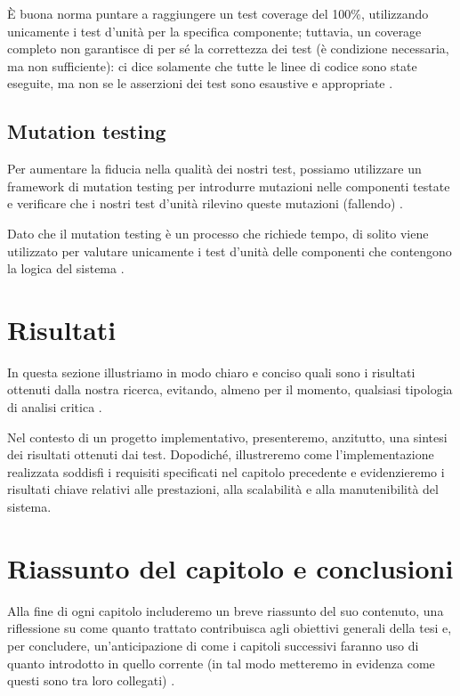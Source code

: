 \medskip

È buona norma puntare a raggiungere un test coverage del 100\%, utilizzando unicamente i test d'unità per la specifica componente; tuttavia, un coverage completo non garantisce di per sé la correttezza dei test (è condizione necessaria, ma non sufficiente): ci dice solamente che tutte le linee di codice sono state eseguite, ma non se le asserzioni dei test sono esaustive e appropriate \cite{bettini2021tdd}.

\subsection{Mutation testing}

Per aumentare la fiducia nella qualità dei nostri test, possiamo utilizzare un framework di mutation testing per introdurre mutazioni nelle componenti testate e verificare che i nostri test d'unità rilevino queste mutazioni (fallendo) \cite{bettini2021tdd}.

\medskip

Dato che il mutation testing è un processo che richiede tempo, di solito viene utilizzato per valutare unicamente i test d'unità delle componenti che contengono la logica del sistema \cite{bettini2021tdd}.

\section{Risultati}

In questa sezione illustriamo in modo chiaro e conciso quali sono i risultati ottenuti dalla nostra ricerca, evitando, almeno per il momento, qualsiasi tipologia di analisi critica \cite{mannisto2022guide}.

\medskip

Nel contesto di un progetto implementativo, presenteremo, anzitutto, una sintesi dei risultati ottenuti dai test. Dopodiché, illustreremo come l'implementazione realizzata soddisfi i requisiti specificati nel capitolo precedente e evidenzieremo i risultati chiave relativi alle prestazioni, alla scalabilità e alla manutenibilità del sistema.

\section{Riassunto del capitolo e conclusioni}

Alla fine di ogni capitolo includeremo un breve riassunto del suo contenuto, una riflessione su come quanto trattato contribuisca agli obiettivi generali della tesi e, per concludere, un'anticipazione di come i capitoli successivi faranno uso di quanto introdotto in quello corrente (in tal modo metteremo in evidenza come questi sono tra loro collegati) \cite{zobel2015writing}.
